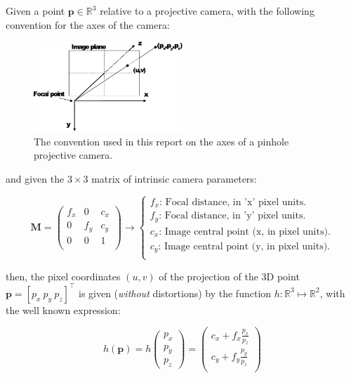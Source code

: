 \documentclass[a4paper,11pt]{report}
\begin{document}
Given a point $\mathbf{p} \in \mathbb{R}^3$ relative to a
projective camera, with the following convention for the axes of the
camera:

\begin{figure}[h!]
\centering
\includegraphics[width=0.50\textwidth]{imgs/pinhole_model.pdf}
\caption{The convention used in this report on the axes of a pinhole projective camera.}
\label{fig:pinhole}
\end{figure}

\noindent and given the $3 \times 3$ matrix of intrinsic camera parameters:

\begin{equation}
\mathbf{M}=
\left(
\begin{array}{ccc}
 f_x & 0 & c_x \\
  0  & f_y & c_y \\
 0 & 0 & 1 \\
\end{array}
\right)
\longrightarrow
\left\{
\begin{array}{l}
 f_x\text{: Focal distance, in 'x' pixel units.} \\
 f_y\text{: Focal distance, in 'y' pixel units.} \\
 c_x\text{: Image central point (x, in pixel units).} \\
 c_y\text{: Image central point (y, in pixel units).} \\
\end{array}
\right.
\end{equation}


\noindent then, the pixel coordinates $(u,v)$ of the projection of the
3D point $\mathbf{p}=[p_x ~ p_y ~ p_z]^\top$
is given (\emph{without} distortions) by the function $h: \mathbb{R}^3 \mapsto \mathbb{R}^2$,
with the well known expression:

\begin{equation}
h(\mathbf{p}) =
h\left(
\begin{array}{c}
 p_x \\ p_y \\p_z
\end{array}
\right) =
\left(
\begin{array}{c}
 c_x + f_x  \frac{p_x}{p_z} \\
 c_y + f_y  \frac{p_y}{p_z} \\
\end{array}
\right)
\end{equation}
\end{document}
